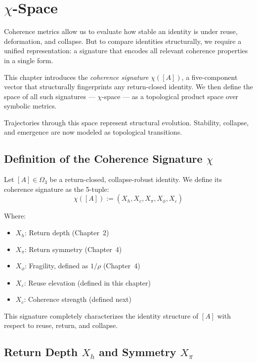 \chapter{$\chi$-Space}

Coherence metrics allow us to evaluate how stable an identity is under reuse, deformation, and collapse.  
But to compare identities structurally, we require a unified representation:  
a signature that encodes all relevant coherence properties in a single form.

This chapter introduces the \textit{coherence signature} $\chi([A])$,  
a five-component vector that structurally fingerprints any return-closed identity.  
We then define the space of all such signatures — $\chi$-space — as a topological product space over symbolic metrics.

Trajectories through this space represent structural evolution.  
Stability, collapse, and emergence are now modeled as topological transitions.

\section{Definition of the Coherence Signature $\chi$}

\begin{definition} \label{def:chi-signature}
Let $[A] \in \Omega_3$ be a return-closed, collapse-robust identity.  
We define its coherence signature as the 5-tuple:
\begin{equation} \label{eq:chi-signature}
\chi([A]) := (X_h, X_c, X_\pi, X_\phi, X_\varepsilon)
\end{equation}

Where:
\begin{itemize}
  \item $X_h$: Return depth (Chapter~2)
  \item $X_\pi$: Return symmetry (Chapter~4)
  \item $X_\phi$: Fragility, defined as $1 / \rho$ (Chapter~4)
  \item $X_\varepsilon$: Reuse elevation (defined in this chapter)
  \item $X_c$: Coherence strength (defined next)
\end{itemize}
\end{definition}

This signature completely characterizes the identity structure of $[A]$ with respect to reuse, return, and collapse.

\section{Return Depth $X_h$ and Symmetry $X_\pi$}

